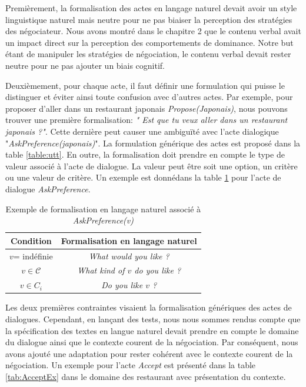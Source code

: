 			Premièrement, la formalisation des actes en langage naturel devait avoir un style linguistique naturel mais neutre pour ne pas biaiser la perception des stratégies des négociateur. Nous avons montré dans le chapitre 2 que le contenu verbal avait un impact direct sur la perception des comportements de dominance. 
			Notre but étant de manipuler les stratégies de négociation, le contenu verbal devait rester neutre pour ne pas ajouter un biais cognitif.
			
			Deuxièmement, pour chaque acte, il faut définir une formulation qui puisse le distinguer et éviter ainsi toute confusion avec d'autres actes. Par exemple, pour proposer d'aller dans un restaurant japonais \emph{Propose(Japonais)}, nous pouvons trouver une première formalisation: \emph{" Est que tu veux aller dans un restaurant japonais ?"}. Cette dernière peut causer une ambiguïté avec l'acte dialogique "\textit{AskPreference(japonais)}". 
			La formulation générique des actes est proposé dans la table \ref{table:utt}. En outre, la formalisation doit prendre en compte le type de valeur associé à l'acte de dialogue. La valeur peut être soit une option, un critère ou une valeur de critère. Un exemple est donnédans la table \ref{tab:askEx} pour l'acte de dialogue \emph{AskPreference}. 
			
			
				\begin{table} [h]
					\begin{tabular} {c c}
						\hline
						\hline
						Condition & Formalisation en langage naturel \\
						\hline
						$v$= indéfinie & \textit{What would you like ?} \\
						\hline
						$v \in \mathcal{C}$ & \textit{What kind of $v$ do you like ?} \\
						\hline
						$ v \in C_i $ & \textit{Do you like $v$ ?} \\
						\hline
						\hline
						
					\end{tabular}
					\caption{\label{tab:askEx} Exemple de formalisation en langage naturel associé à \emph{AskPreference(v)}}
				\end{table}
			
			Les deux premières contraintes visaient la formalisation génériques des actes de dialogues. Cependant, en lançant des tests, nous nous sommes rendus compte que la spécification des textes en langue naturel devait prendre en compte le domaine du dialogue ainsi que le contexte courent de la négociation. 
			Par conséquent, nous avons ajouté une adaptation pour rester cohérent avec le contexte courent de la négociation. Un exemple pour l'acte \emph{Accept} est présenté dans la table \ref{tab:AcceptEx} dans le domaine des restaurant avec présentation du contexte.
			
